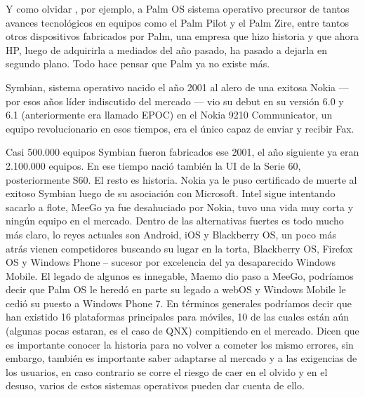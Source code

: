 Y como olvidar , por ejemplo,  a Palm OS sistema operativo precursor de tantos avances tecnológicos en equipos como el Palm Pilot y el Palm Zire, entre tantos otros 
dispositivos fabricados por Palm, una empresa que hizo historia y que ahora HP, luego de adquirirla a mediados del año pasado, ha pasado a dejarla en segundo plano. Todo 
hace pensar que Palm ya no existe más.

Symbian, sistema operativo nacido el año 2001 al alero de una exitosa Nokia — por esos años líder indiscutido del mercado — vio su debut en su versión 6.0 y 6.1 
(anteriormente era llamado EPOC) en el Nokia 9210 Communicator, un equipo revolucionario en esos tiempos, era el único capaz de enviar y recibir Fax.

Casi 500.000 equipos Symbian fueron fabricados ese 2001, el año siguiente ya eran 2.100.000 equipos. En ese tiempo nació también la UI de la Serie 60, posteriormente S60. 
El resto es historia. Nokia ya le puso certificado de muerte al exitoso Symbian luego de su asociación con Microsoft.
Intel sigue intentando sacarlo a flote, MeeGo ya fue desahuciado por Nokia, tuvo una vida muy corta y ningún equipo en el mercado.
Dentro de las alternativas fuertes es todo mucho más claro, lo reyes actuales son Android, iOS y Blackberry OS, un poco más atrás vienen competidores buscando su lugar en 
la torta, Blackberry OS, Firefox OS y Windows Phone  – sucesor por excelencia del ya desaparecido Windows Mobile. El legado de algunos es innegable, Maemo dio paso a MeeGo, 
podríamos decir que Palm OS le heredó en parte su legado a webOS y Windows Mobile le cedió su puesto a Windows Phone 7.
En términos generales podríamos decir que han existido 16 plataformas principales para móviles, 10 de las cuales están aún (algunas pocas estaran, es el caso de QNX) 
compitiendo en el mercado.
Dicen que es importante conocer la historia para no volver a cometer los mismo errores, sin embargo, también es importante saber adaptarse al mercado y a las exigencias de 
los usuarios, en caso contrario se corre el riesgo de caer en el olvido y en el desuso, varios de estos sistemas operativos pueden dar cuenta de ello.

